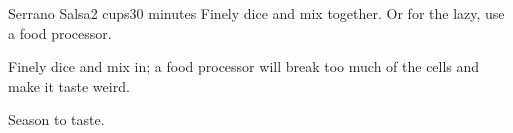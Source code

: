 \documentclass[../Cookbook.tex]{subfiles}
\begin{document}
\begin{recipe}{Serrano Salsa}{2 cups}{30 minutes}
	Finely dice and mix together. Or for the lazy, use a food processor.

	Finely dice and mix in; a food processor will break too much of the cells and make it taste weird.

	Season to taste.

\end{recipe}
\end{document}
